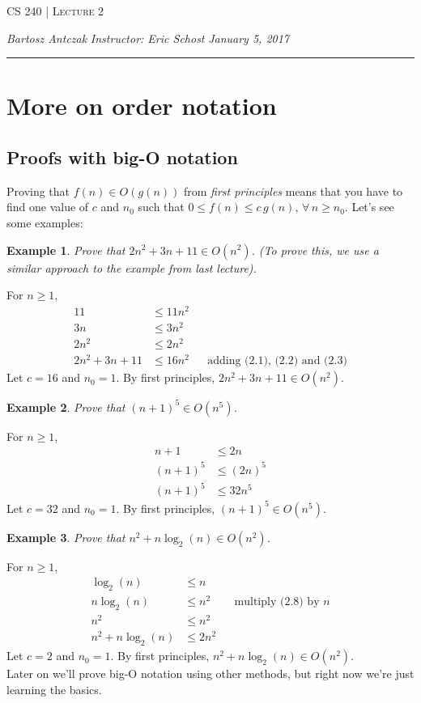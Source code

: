 \documentclass{report}
\newcommand{\lectureNum}{2}
\newcommand{\curDate}{January 5, 2017}
\newcommand{\course}{CS 240}
\newtheorem{ex}{Example}[section]
\begin{document}
\begin{center}
\begin{Large}
\textsc{\course{} | Lecture \lectureNum{}}
\end{Large}
\end{center} 
\noindent \textit{Bartosz Antczak} \hfill
\textit{Instructor: Eric Schost} \hfill
\textit{\curDate{}}
\rule{\textwidth}{0.4pt}
\section{More on order notation}
\subsection{Proofs with big-O notation}
Proving that $f(n) \in O(g(n))$ from \textit{first principles} means that you have to find one value of $c$ and $n_0$ such that $0 \leq f(n) \leq c \, g(n)$, $\forall\, n \geq n_0$.
Let's see some examples:
\begin{ex}
Prove that $2n^2 + 3n + 11 \in O(n^2)$. (To prove this, we use a similar approach to the example from last lecture).
\end{ex}
\noindent For $n \geq 1,$
\begin{align}
11 &\leq 11n^2 \\
3n &\leq 3n^2 \\
2n^2 &\leq 2n^2 \\
2n^2 + 3n + 11 &\leq 16n^2 && \text{adding (2.1), (2.2) and (2.3)}
\end{align}
Let $c = 16$ and $n_0 = 1$. By first principles, $2n^2 + 3n + 11 \in O(n^2)$.
\begin{ex}
Prove that $(n+1)^5 \in O(n^5)$.
\end{ex}
\noindent For $n \geq 1$,
\begin{align}
n + 1 &\leq 2n \\
(n + 1)^5 &\leq (2n)^5 \\
(n + 1)^5 &\leq 32n^5
\end{align}
Let $c = 32$ and $n_0 = 1$. By first principles, $(n + 1)^5 \in O(n^5)$.
\begin{ex}
Prove that $n^2 + n \log_2 (n) \in O(n^2)$.
\end{ex}
\noindent For $n \geq 1$,
\begin{align}
\log_2 (n) &\leq n \\
n \log_2 (n) &\leq n^2 && \text{multiply (2.8) by }n \\
n^2 &\leq n^2 \\
n^2 + n \log_2 (n) &\leq 2n^2
\end{align}
Let $c = 2$ and $n_0 = 1$. By first principles, $n^2 + n \log_2 (n) \in O(n^2)$. \\
Later on we'll prove big-O notation using other methods, but right now we're just learning the basics.
\end{document}
